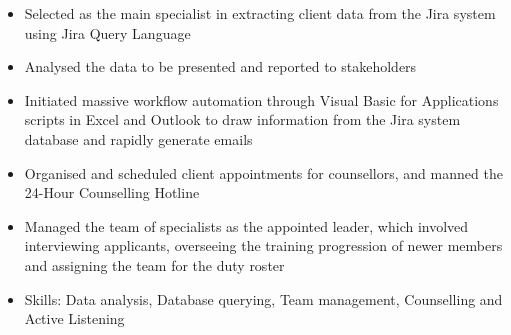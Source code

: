 \documentclass{cv}
\begin{document}
\begin{subsections}
    \subtitle{SAF Counselling Centre \hfill Singapore}
    \begin{itemize}
        \item Selected as the main specialist in extracting client data from the Jira system using Jira Query Language
        \item Analysed the data to be presented and reported to stakeholders
        \item Initiated massive workflow automation through Visual Basic for Applications scripts in Excel and Outlook to draw information from the Jira system database and rapidly generate emails
        \item Organised and scheduled client appointments for counsellors, and manned the 24-Hour Counselling Hotline
        \item Managed the team of specialists as the appointed leader, which involved interviewing applicants, overseeing the training progression of newer members and assigning the team for the duty roster
        \item Skills: Data analysis, Database querying, Team management, Counselling and Active Listening
    \end{itemize}
\end{subsections}



\end{document}
